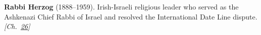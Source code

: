 \textbf{Rabbi Herzog} (1888–1959). Irish-Israeli religious leader who served as the Ashkenazi Chief Rabbi of Israel and resolved the International Date Line dispute. \emph{[Ch.~\hyperref[ch:jewishcalendar]{26}]}

